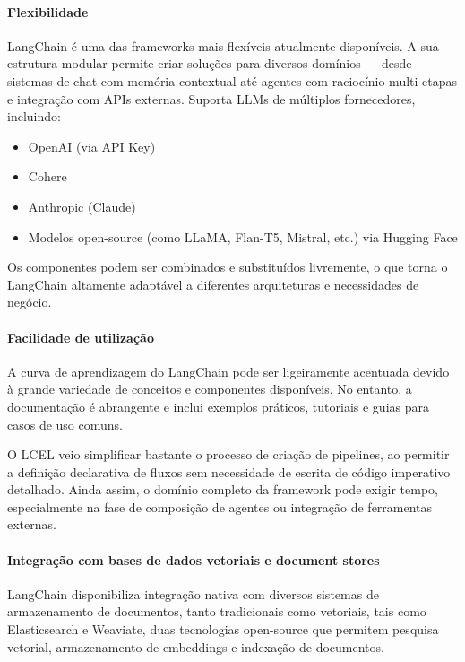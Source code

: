 \paragraph{Flexibilidade}

LangChain é uma das frameworks mais flexíveis atualmente disponíveis. A sua estrutura modular permite criar soluções para diversos domínios — desde sistemas de chat com memória contextual até agentes com raciocínio multi-etapas e integração com APIs externas. Suporta LLMs de múltiplos fornecedores, incluindo:

\begin{itemize} \item OpenAI (via API Key) \item Cohere \item Anthropic (Claude) \item Modelos open-source (como LLaMA, Flan-T5, Mistral, etc.) via Hugging Face \end{itemize}

Os componentes podem ser combinados e substituídos livremente, o que torna o LangChain altamente adaptável a diferentes arquiteturas e necessidades de negócio.

\paragraph{Facilidade de utilização}

A curva de aprendizagem do LangChain pode ser ligeiramente acentuada devido à grande variedade de conceitos e componentes disponíveis. No entanto, a documentação é abrangente e inclui exemplos práticos, tutoriais e guias para casos de uso comuns.

O LCEL veio simplificar bastante o processo de criação de pipelines, ao permitir a definição declarativa de fluxos sem necessidade de escrita de código imperativo detalhado. Ainda assim, o domínio completo da framework pode exigir tempo, especialmente na fase de composição de agentes ou integração de ferramentas externas.

\paragraph{Integração com bases de dados vetoriais e document stores}

LangChain disponibiliza integração nativa com diversos sistemas de armazenamento de documentos, tanto tradicionais como vetoriais, tais como Elasticsearch e Weaviate, duas tecnologias open-source que permitem pesquisa vetorial, armazenamento de embeddings e indexação de documentos.

